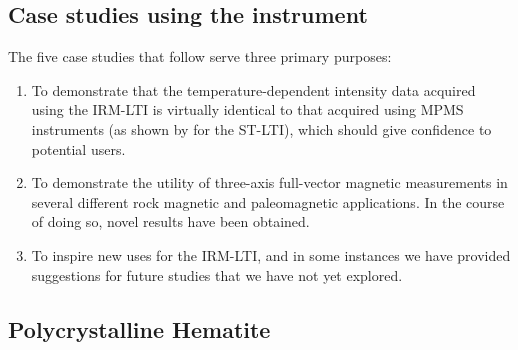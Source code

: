 \documentclass[draft,gc]{AGUTeX}
\begin{document}
\begin{article}
\section{Case studies using the instrument}
The five case studies that follow serve three primary purposes:
\begin{enumerate}
\item To demonstrate that the temperature-dependent intensity data acquired using the IRM-LTI is virtually identical to that acquired using MPMS instruments (as shown by \cite{Smirnov2011a} for the ST-LTI), which should give confidence to potential users. 
\item To demonstrate the utility of three-axis full-vector magnetic measurements in several different rock magnetic and paleomagnetic applications. In the course of doing so, novel results have been obtained.
\item To inspire new uses for the IRM-LTI, and in some instances we have provided suggestions for future studies that we have not yet explored. 
\end{enumerate}

\subsection{Polycrystalline Hematite}


\end{article}
\end{document}
